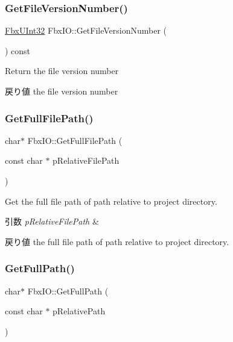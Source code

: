 \subsubsection{\texorpdfstring{Get\+File\+Version\+Number()}{GetFileVersionNumber()}}
{\footnotesize\ttfamily \hyperlink{fbxtypes_8h_a53c19005808129cb4efa0dcbb71fdb09}{Fbx\+U\+Int32} Fbx\+I\+O\+::\+Get\+File\+Version\+Number (\begin{DoxyParamCaption}{ }\end{DoxyParamCaption}) const}

Return the file version number \begin{DoxyReturn}{戻り値}
the file version number 
\end{DoxyReturn}
\mbox{\label{class_fbx_i_o_a368bd527e80f3b4d65d81c75da8bfd19}} 
\subsubsection{\texorpdfstring{Get\+Full\+File\+Path()}{GetFullFilePath()}}
{\footnotesize\ttfamily char$\ast$ Fbx\+I\+O\+::\+Get\+Full\+File\+Path (\begin{DoxyParamCaption}\item[{const char $\ast$}]{p\+Relative\+File\+Path }\end{DoxyParamCaption})}

Get the full file path of path relative to project directory. 
\begin{DoxyParams}{引数}
{\em p\+Relative\+File\+Path} & \\
\hline
\end{DoxyParams}
\begin{DoxyReturn}{戻り値}
the full file path of path relative to project directory. 
\end{DoxyReturn}
\mbox{\label{class_fbx_i_o_aafb87b123c805ecab97d903b3b45decf}} 
\subsubsection{\texorpdfstring{Get\+Full\+Path()}{GetFullPath()}}
{\footnotesize\ttfamily char$\ast$ Fbx\+I\+O\+::\+Get\+Full\+Path (\begin{DoxyParamCaption}\item[{const char $\ast$}]{p\+Relative\+Path }\end{DoxyParamCaption})}

